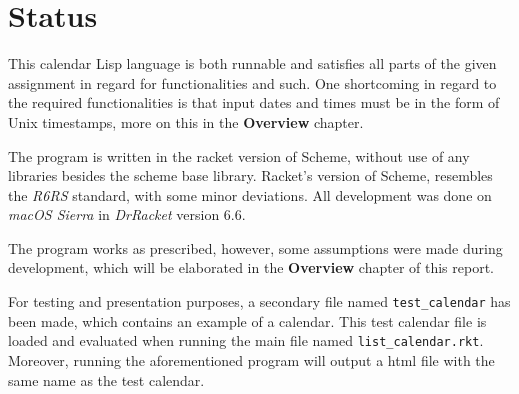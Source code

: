 \chapter{Status}

This calendar Lisp language is both runnable and satisfies all parts of the given assignment in regard for functionalities and such.
One shortcoming in regard to the required functionalities is that input dates and times must be in the form of Unix timestamps, more on this in the \textbf{Overview} chapter.

\medskip
The program is written in the racket version of Scheme, without use of any libraries besides the scheme base library.
Racket's version of Scheme, resembles the \textit{R6RS} standard, with some minor deviations.
All development was done on \textit{macOS Sierra} in \textit{DrRacket} version 6.6.

\medskip
The program works as prescribed, however, some assumptions were made during development, which will be elaborated in the \textbf{Overview} chapter of this report.

For testing and presentation purposes, a secondary file named \texttt{test\_calendar} has been made, which contains an example of a calendar.
This test calendar file is loaded and evaluated when running the main file named \texttt{list\_calendar.rkt}.
Moreover, running the aforementioned program will output a html file with the same name as the test calendar.
